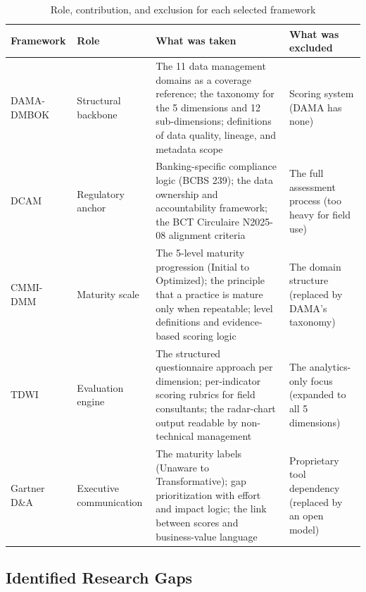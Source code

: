 \begin{table}[H]
\centering
\caption{Role, contribution, and exclusion for each selected framework} \label{tab:framework-roles}

{\footnotesize
\setlength{\tabcolsep}{4pt}
\begin{tabular}{|p{1.9cm}|p{2.3cm}|p{6.6cm}|p{3.7cm}|}
\hline
\textbf{Framework} & \textbf{Role} & \textbf{What was taken} & \textbf{What was excluded} \\
\hline
DAMA-DMBOK & Structural backbone & The 11 data management domains as a coverage reference; the taxonomy for the 5 dimensions and 12 sub-dimensions; definitions of data quality, lineage, and metadata scope & Scoring system (DAMA has none) \\
\hline
DCAM & Regulatory anchor & Banking-specific compliance logic (BCBS 239); the data ownership and accountability framework; the BCT Circulaire N\textdegree{}2025-08 alignment criteria & The full assessment process (too heavy for field use) \\
\hline
CMMI-DMM & Maturity scale & The 5-level maturity progression (Initial to Optimized); the principle that a practice is mature only when repeatable; level definitions and evidence-based scoring logic & The domain structure (replaced by DAMA's taxonomy) \\
\hline
TDWI & Evaluation engine & The structured questionnaire approach per dimension; per-indicator scoring rubrics for field consultants; the radar-chart output readable by non-technical management & The analytics-only focus (expanded to all 5 dimensions) \\
\hline
Gartner D\&A & Executive communication & The maturity labels (Unaware to Transformative); gap prioritization with effort and impact logic; the link between scores and business-value language & Proprietary tool dependency (replaced by an open model) \\
\hline
\end{tabular}
}

\end{table}

\subsection{Identified Research Gaps}

